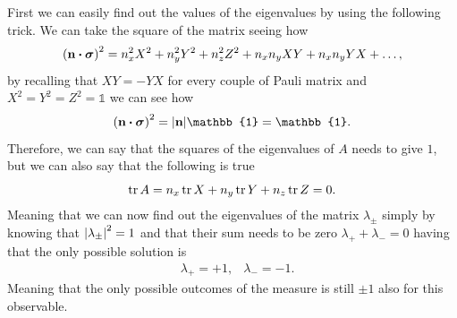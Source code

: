 {
    First we can easily find out the values of the eigenvalues by using the following trick. We can take the square of the matrix seeing how
    \begin{equation}
        \left( \vb{n}\vdot\vb*{\sigma} \right)^2 = n_x^2 X^2 + n_y^2 Y^2 + n_z^2Z^2 + n_xn_yXY + n_xn_yYX + \dots,
    \end{equation}
    by recalling that $XY = -YX$ for every couple of Pauli matrix and $X^2=Y^2=Z^2 = \mathbb{1}$ we can see how
    \begin{equation}
        \left( \vb{n}\vdot\vb*{\sigma} \right)^2 = \abs{\vb{n}}\mathbb{1} = \mathbb{1}.
    \end{equation}
    Therefore, we can say that the squares of the eigenvalues of $A$ needs to give $1$, but we can also say that the following is true
    \begin{equation}
        \trace{A} = n_x \trace{X} + n_y \trace{Y} + n_z\trace{Z} = 0.
    \end{equation}
    Meaning that we can now find out the eigenvalues of the matrix $\lambda_{\pm}$ simply by knowing that $\abs{\lambda_{\pm}}^2 = 1$ and that their sum needs to be zero $\lambda_+ + \lambda_- = 0$ having that the only possible solution is
    \begin{align}
        &\lambda_+ = +1, &\lambda_- = -1.
    \end{align}
    Meaning that the only possible outcomes of the measure is still $\pm 1$ also for this observable.

}
